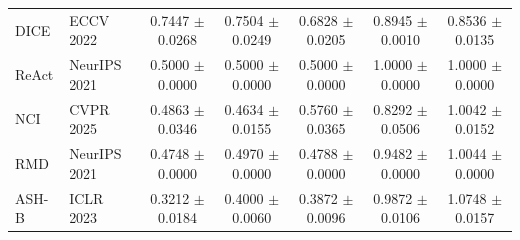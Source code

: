 \begin{table}[!htbp]
{\begin{tabular}{llccccc}
DICE & ECCV 2022 & 0.7447 $\pm$ 0.0268 & 0.7504 $\pm$ 0.0249 & 0.6828 $\pm$ 0.0205 & 0.8945 $\pm$ 0.0010 & 0.8536 $\pm$ 0.0135 \\
ReAct & NeurIPS 2021 & 0.5000 $\pm$ 0.0000 & 0.5000 $\pm$ 0.0000 & 0.5000 $\pm$ 0.0000 & 1.0000 $\pm$ 0.0000 & 1.0000 $\pm$ 0.0000 \\
NCI & CVPR 2025 & 0.4863 $\pm$ 0.0346 & 0.4634 $\pm$ 0.0155 & 0.5760 $\pm$ 0.0365 & 0.8292 $\pm$ 0.0506 & 1.0042 $\pm$ 0.0152 \\
RMD & NeurIPS 2021 & 0.4748 $\pm$ 0.0000 & 0.4970 $\pm$ 0.0000 & 0.4788 $\pm$ 0.0000 & 0.9482 $\pm$ 0.0000 & 1.0044 $\pm$ 0.0000 \\
ASH-B & ICLR 2023 & 0.3212 $\pm$ 0.0184 & 0.4000 $\pm$ 0.0060 & 0.3872 $\pm$ 0.0096 & 0.9872 $\pm$ 0.0106 & 1.0748 $\pm$ 0.0157 \\
\bottomrule
\end{tabular}%
}
\end{table}

\clearpage

